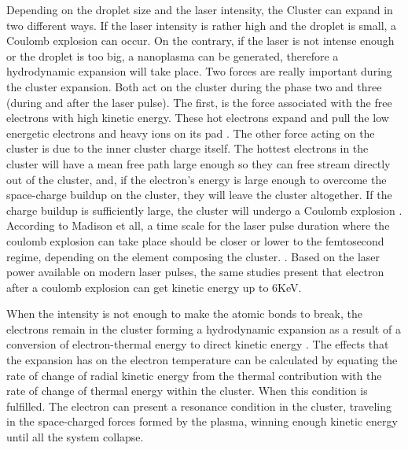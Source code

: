{Depending on the droplet size and the laser intensity, the Cluster can expand in two different ways. If the laser intensity is rather high and the droplet is small, a Coulomb explosion can occur. On the contrary, if the laser is not intense enough or the droplet is too big, a nanoplasma can be generated, therefore a hydrodynamic expansion will take place. 
Two forces are really important during the cluster expansion. Both act on the cluster during the phase two and three (during and after the laser pulse). The first, is the force associated with the free electrons with high kinetic energy. These hot electrons expand and pull the low energetic electrons and heavy ions on its pad \cite{ditmire_interaction_1996}. The other force acting on the cluster is due to the inner cluster charge itself. The hottest electrons in the cluster will have a mean free path large enough so they can free stream directly out of the cluster, and, if the electron’s energy is large enough to overcome the space-charge buildup on the cluster, they will leave the cluster altogether. If the charge buildup is sufficiently large, the cluster will undergo a Coulomb explosion \cite{haught_formation_1970}. According to Madison et all, a time scale for the laser pulse duration where the coulomb explosion can take place should be closer or lower to the femtosecond regime, depending on the element composing the cluster. \cite{madison_role_2004}. Based on the laser power available on modern laser pulses, the same studies present that electron after a coulomb explosion can get kinetic energy up to 6KeV.


When the intensity is not enough to make the atomic bonds to break, the electrons remain in the cluster forming a hydrodynamic expansion as a result of a conversion of electron-thermal energy to direct kinetic energy \cite{erk_nobel_2009}. The effects that the expansion has on the electron temperature can be calculated by equating the rate of change of radial kinetic energy from the thermal contribution with the rate of change of thermal energy within the cluster. When this condition is fulfilled. The electron can present a resonance condition in the cluster, traveling in the space-charged forces formed by the plasma, winning enough kinetic energy until all the system collapse.

}
